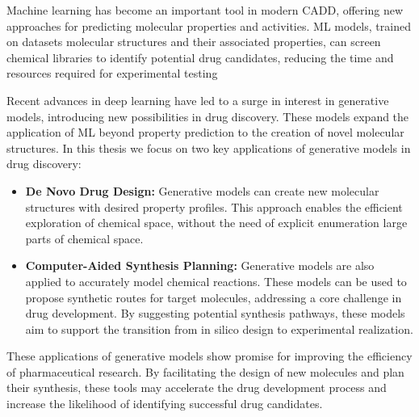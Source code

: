 Machine learning has become an important tool in modern CADD, offering new approaches for predicting
molecular properties and activities. ML models, trained on datasets molecular structures and their
associated properties, can screen chemical libraries to identify potential drug candidates, reducing
the time and resources required for experimental testing

Recent advances in deep learning have led to a surge in interest in generative models, introducing
new possibilities in drug discovery. These models expand the application of ML beyond property
prediction to the creation of novel molecular structures. In this thesis we focus on two key
applications of generative models in drug discovery:
\begin{itemize}
      \item \textbf{De Novo Drug Design:} Generative models can create new molecular structures with desired property
            profiles. This approach enables the efficient exploration of chemical space, without the need of
            explicit enumeration large parts of chemical space.
      \item \textbf{Computer-Aided Synthesis Planning:} Generative models are also applied to accurately model
            chemical reactions. These models can be used to propose synthetic routes
            for target molecules, addressing a core challenge in drug development. By suggesting potential synthesis
            pathways, these models aim to support the transition from in silico design to experimental
            realization.
\end{itemize}

These applications of generative models show promise for improving the efficiency
of pharmaceutical research. By facilitating the design of new molecules and plan their
synthesis, these tools may accelerate the drug development process and increase the likelihood of
identifying successful drug candidates.   

